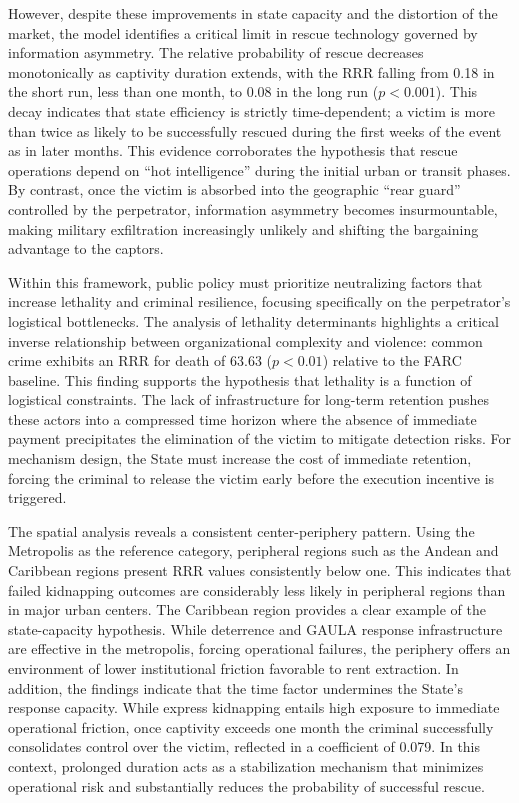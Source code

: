 \documentclass[12pt,a4paper]{article}
\theoremstyle{plain}
\theoremstyle{definition}
\theoremstyle{remark}
\newcommand{\1}{\mathbf{1}}
\begin{document}
However, despite these improvements in state capacity and the distortion of the market, the model identifies a critical limit in rescue technology governed by information asymmetry. The relative probability of rescue decreases monotonically as captivity duration extends, with the RRR falling from 0.18 in the short run, less than one month, to 0.08 in the long run (\(p<0.001\)). This decay indicates that state efficiency is strictly time-dependent; a victim is more than twice as likely to be successfully rescued during the first weeks of the event as in later months. This evidence corroborates the hypothesis that rescue operations depend on ``hot intelligence'' during the initial urban or transit phases. By contrast, once the victim is absorbed into the geographic ``rear guard'' controlled by the perpetrator, information asymmetry becomes insurmountable, making military exfiltration increasingly unlikely and shifting the bargaining advantage to the captors.

Within this framework, public policy must prioritize neutralizing factors that increase lethality and criminal resilience, focusing specifically on the perpetrator's logistical bottlenecks. The analysis of lethality determinants highlights a critical inverse relationship between organizational complexity and violence: common crime exhibits an RRR for death of 63.63 (\(p<0.01\)) relative to the FARC baseline. This finding supports the hypothesis that lethality is a function of logistical constraints. The lack of infrastructure for long-term retention pushes these actors into a compressed time horizon where the absence of immediate payment precipitates the elimination of the victim to mitigate detection risks. For mechanism design, the State must increase the cost of immediate retention, forcing the criminal to release the victim early before the execution incentive is triggered.

The spatial analysis reveals a consistent center-periphery pattern. Using the Metropolis as the reference category, peripheral regions such as the Andean and Caribbean regions present RRR values consistently below one. This indicates that failed kidnapping outcomes are considerably less likely in peripheral regions than in major urban centers. The Caribbean region provides a clear example of the state-capacity hypothesis. While deterrence and GAULA response infrastructure are effective in the metropolis, forcing operational failures, the periphery offers an environment of lower institutional friction favorable to rent extraction. In addition, the findings indicate that the time factor undermines the State's response capacity. While express kidnapping entails high exposure to immediate operational friction, once captivity exceeds one month the criminal successfully consolidates control over the victim, reflected in a coefficient of 0.079. In this context, prolonged duration acts as a stabilization mechanism that minimizes operational risk and substantially reduces the probability of successful rescue.
\end{document}
